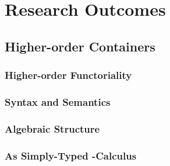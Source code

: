 \chapter{Research Outcomes}

\section{Higher-order Containers}

\subsection{Higher-order Functoriality}

\subsection{Syntax and Semantics}

\subsection{Algebraic Structure}

\subsection{As Simply-Typed \lambda-Calculus}